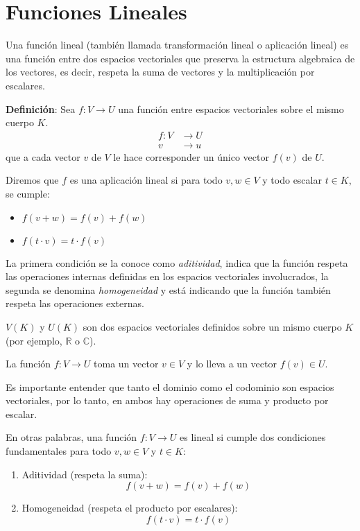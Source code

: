 \section{Funciones Lineales}

Una función lineal (también llamada transformación lineal o aplicación lineal) es una función entre dos espacios vectoriales que preserva la estructura algebraica de los vectores, es decir, respeta la suma de vectores y la multiplicación por escalares.

\textbf{Definición}: Sea \(f: V \to U\) una función entre espacios vectoriales sobre el mismo cuerpo \(K\). 
\begin{align*}
  f: V &\rightarrow U\\
  v &\rightarrow u
\end{align*}
que a cada vector \(v\) de \(V\) le hace corresponder un único vector \(f(v)\) de \(U\).

Diremos que \(f\) es una aplicación lineal si para todo \(v, w \in V\) y todo escalar \(t \in K\), se cumple:
\begin{itemize}
  \item \(f(v + w) = f(v) + f(w)\)
  \item \(f(t \cdot v) = t \cdot f(v)\)
\end{itemize}

La primera condición se la conoce como \textit{aditividad}, indica que la función respeta las operaciones internas definidas en los espacios vectoriales involucrados, la segunda se denomina \textit{homogeneidad} y está indicando que la función también respeta las operaciones externas. 

\begin{tcolorbox}[remember, title=Aclaración]
  \(V(K)\) y \(U(K)\) son dos espacios vectoriales definidos sobre un mismo cuerpo \(K\) (por ejemplo, \(\mathbb{R}\) o \(\mathbb{C}\)).
  
  La función \(f: V \rightarrow U\) toma un vector \(v \in V\) y lo lleva a un vector \(f(v) \in U\).
  
  Es importante entender que tanto el dominio como el codominio son espacios vectoriales, por lo tanto, en ambos hay operaciones de suma y producto por escalar.
\end{tcolorbox}

En otras palabras, una función \(f: V \rightarrow U\) es lineal si cumple dos condiciones fundamentales para todo \(v, w \in V\) y \(t \in K\):
\begin{enumerate}
  \item Aditividad (respeta la suma):
    \[
     f(v + w) = f(v) + f(w)
    \]
  \item Homogeneidad (respeta el producto por escalares):
    \[
      f(t \cdot v) = t \cdot f(v)
    \]
\end{enumerate}

